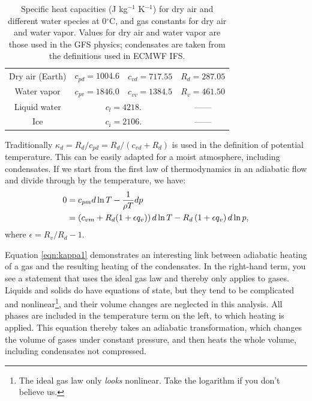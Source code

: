 \documentclass[10pt,letterpaper,margin=1in]{memoir}
\begin{document}
\begin{table}[tp]
   \centering
   \caption{Specific heat capacities (J kg$^{-1}$ K$^{-1}$) for dry air and different water species at 0$^\circ$C, and gas constants for dry air and water vapor. Values for dry air and water vapor are those used in the GFS physics; condensates are taken from the definitions used in ECMWF IFS.} %
   \begin{tabular}{cccc} 
   \hline
 Dry air (Earth) & $c_{pd} = 1004.6$ & $c_{vd} = 717.55$ & $R_{d} = 287.05$\\
 Water vapor  & $c_{pv} = 1846.0$ & $c_{vv} = 1384.5$ & $R_{v} = 461.50$ \\
 \hline
 Liquid water & \multicolumn{2}{c}{$c_l = 4218.$} & ------ \\
 Ice & \multicolumn{2}{c}{$c_i = 2106.$} & ------ \\ \hline
   \end{tabular}
   
   \label{table:heatcapacities}
\end{table}

Traditionally $\kappa_d = R_d/c_{pd} = R_d/\left( c_{vd} + R_d\right )$ is used in the definition of potential temperature. This can be easily adapted for a moist atmosphere, including condensates. If we start from the first law of thermodynamics in an adiabatic flow and divide through by the temperature, we have:
\begin{align} 
\notag  0 & = c_{pm} d \ln T - \frac{1}{\rho T} dp\\
                & = \left ( c_{vm} + R_d (1 + \epsilon q_v) \right ) d \ln T - R_d \left ( 1 + \epsilon q_v \right ) d \ln p, \label{eqn:kappa1}
\end{align}
where $\epsilon = R_v/R_d -1$.

Equation \eqref{eqn:kappa1} demonstrates an interesting link between adiabatic heating of a gas and the resulting heating of the condensates. In the right-hand term, you see a statement that uses the ideal gas law and thereby only applies to gases. Liquids and solids do have equations of state, but they tend to be complicated and nonlinear\footnote{The ideal gas law only \textit{looks} nonlinear. Take the logarithm if you don't believe us.}, and their volume changes are neglected in this analysis. All phases are included in the temperature term on the left, to which heating is applied. This equation thereby takes an adiabatic transformation, which changes the volume of gases under constant pressure, and then heats the whole volume, including condensates not compressed.
\end{document}
